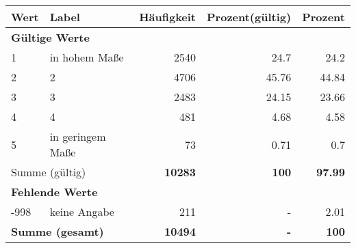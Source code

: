      \begin{longtable}{lXrrr}
     \toprule
     \textbf{Wert} & \textbf{Label} & \textbf{Häufigkeit} & \textbf{Prozent(gültig)} & \textbf{Prozent} \\
     \endhead
     \midrule
     \multicolumn{5}{l}{\textbf{Gültige Werte}}\\

     1 &
     \multicolumn{1}{X}{ in hohem Maße   } &


       \num{2540} &
       \num[round-mode=places,round-precision=2]{24.7} &
         \num[round-mode=places,round-precision=2]{24.2} \\

     2 &
     \multicolumn{1}{X}{ 2   } &


       \num{4706} &
       \num[round-mode=places,round-precision=2]{45.76} &
         \num[round-mode=places,round-precision=2]{44.84} \\

     3 &
     \multicolumn{1}{X}{ 3   } &


       \num{2483} &
       \num[round-mode=places,round-precision=2]{24.15} &
         \num[round-mode=places,round-precision=2]{23.66} \\

     4 &
     \multicolumn{1}{X}{ 4   } &


       \num{481} &
       \num[round-mode=places,round-precision=2]{4.68} &
         \num[round-mode=places,round-precision=2]{4.58} \\

     5 &
     \multicolumn{1}{X}{ in geringem Maße   } &


       \num{73} &
       \num[round-mode=places,round-precision=2]{0.71} &
         \num[round-mode=places,round-precision=2]{0.7} \\
     \midrule
     \multicolumn{2}{l}{Summe (gültig)} &
       \textbf{\num{10283}} &
     \textbf{\num{100}} &
       \textbf{\num[round-mode=places,round-precision=2]{97.99}} \\
     \multicolumn{5}{l}{\textbf{Fehlende Werte}}\\
       -998 &
       keine Angabe &
         \num{211} &
        - &
         \num[round-mode=places,round-precision=2]{2.01} \\
     \midrule
     \multicolumn{2}{l}{\textbf{Summe (gesamt)}} &
          \textbf{\num{10494}} &
        \textbf{-} &
        \textbf{\num{100}} \\
     \bottomrule
     \end{longtable}
     
